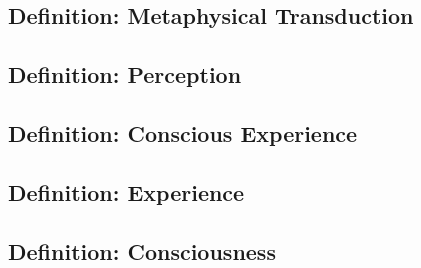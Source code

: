 \documentclass[runningheads]{llncs}
\begin{document}
\subsection{Definition: Metaphysical Transduction}

\subsection{Definition: Perception}

\subsection{Definition: Conscious Experience}

\subsection{Definition: Experience}

\subsection{Definition: Consciousness}

\end{document}
